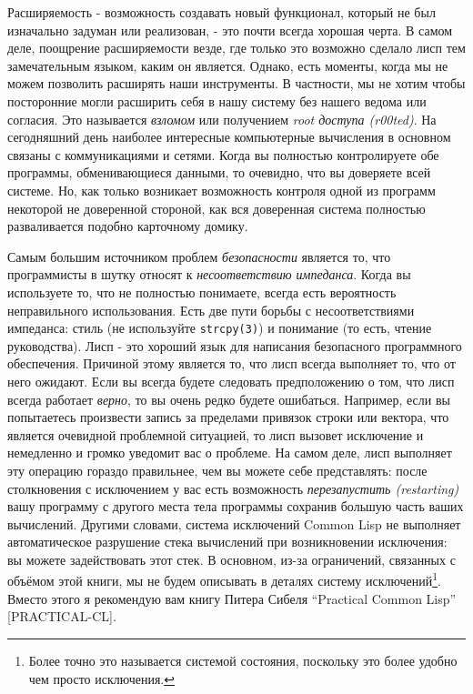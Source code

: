 Расширяемость - возможность создавать новый функционал, который не был изначально задуман или реализован, - это почти всегда хорошая черта. В самом деле, поощрение расширяемости везде, где только это возможно сделало лисп тем замечательным языком, каким он является. Однако, есть моменты, когда мы не можем позволить расширять наши инструменты. В частности, мы не хотим чтобы посторонние могли расширить себя в нашу систему без нашего ведома или согласия. Это называется \emph{взломом} или получением \emph{root доступа (r00ted)}. На сегодняшний день наиболее интересные компьютерные вычисления в основном связаны с коммуникациями и сетями. Когда вы полностью контролируете обе программы, обменивающиеся данными, то очевидно, что вы доверяете всей системе. Но, как только возникает возможность контроля одной из программ некоторой не доверенной стороной, как вся доверенная система полностью разваливается подобно карточному домику.

Самым большим источником проблем \emph{безопасности} является то, что программисты в шутку относят к \emph{несоответствию импеданса}. Когда вы используете то, что не полностью понимаете, всегда есть вероятность неправильного использования. Есть две пути борьбы с несоответствиями импеданса: стиль (не используйте \verb"strcpy(3)") и понимание (то есть, чтение руководства). Лисп - это хороший язык для написания безопасного программного обеспечения. Причиной этому является то, что лисп всегда выполняет то, что от него ожидают. Если вы всегда будете следовать предположению о том, что лисп всегда работает \emph{верно}, то вы очень редко будете ошибаться. Например, если вы попытаетесь произвести запись за пределами привязок строки или вектора, что является очевидной проблемной ситуацией, то лисп вызовет исключение и немедленно и громко уведомит вас о проблеме. На самом деле, лисп выполняет эту операцию гораздо правильнее, чем вы можете себе представлять: после столкновения с исключением у вас есть возможность \emph{перезапустить (restarting)} вашу программу с другого места тела программы сохранив большую часть ваших вычислений. Другими словами, система исключений Common Lisp не выполняет автоматическое разрушение стека вычислений при возникновении исключения: вы можете задействовать этот стек. В основном, из-за ограничений, связанных с объёмом этой книги, мы не будем описывать в деталях систему исключений\footnote{Более точно это называется системой состояния, поскольку это более удобно чем просто исключения.}. Вместо этого я рекомендую вам книгу Питера Сибеля ``Practical Common Lisp'' [PRACTICAL-CL].

